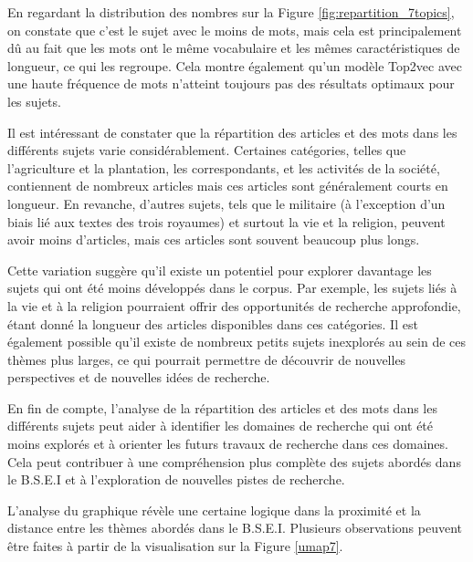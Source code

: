 En regardant la distribution des nombres sur la Figure \ref{fig:repartition_7topics}, on constate que c'est le sujet avec le moins de mots, mais cela est principalement dû au fait que les mots ont le même vocabulaire et les mêmes caractéristiques de longueur, ce qui les regroupe. Cela montre également qu'un modèle Top2vec avec une haute fréquence de mots n'atteint toujours pas des résultats optimaux pour les sujets.

Il est intéressant de constater que la répartition des articles et des mots dans les différents sujets varie considérablement. Certaines catégories, telles que l'agriculture et la plantation, les correspondants, et les activités de la société, contiennent de nombreux articles mais ces articles sont généralement courts en longueur. En revanche, d'autres sujets, tels que le militaire (à l'exception d'un biais lié aux textes des trois royaumes) et surtout la vie et la religion, peuvent avoir moins d'articles, mais ces articles sont souvent beaucoup plus longs.

Cette variation suggère qu'il existe un potentiel pour explorer davantage les sujets qui ont été moins développés dans le corpus. Par exemple, les sujets liés à la vie et à la religion pourraient offrir des opportunités de recherche approfondie, étant donné la longueur des articles disponibles dans ces catégories. Il est également possible qu'il existe de nombreux petits sujets inexplorés au sein de ces thèmes plus larges, ce qui pourrait permettre de découvrir de nouvelles perspectives et de nouvelles idées de recherche.

En fin de compte, l'analyse de la répartition des articles et des mots dans les différents sujets peut aider à identifier les domaines de recherche qui ont été moins explorés et à orienter les futurs travaux de recherche dans ces domaines. Cela peut contribuer à une compréhension plus complète des sujets abordés dans le B.S.E.I et à l'exploration de nouvelles pistes de recherche.

L'analyse du graphique révèle une certaine logique dans la proximité et la distance entre les thèmes abordés dans le B.S.E.I. Plusieurs observations peuvent être faites à partir de la visualisation sur la Figure \ref{umap7}.

